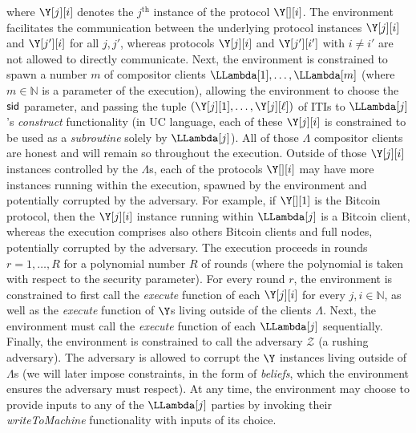 where $\Y[j][i]$ denotes the $j^\text{th}$ instance of
the protocol $\Y[][i]$. The environment facilitates the communication
between the underlying protocol instances $\Y[j][i]$ and $\Y[j'][i]$
for all $j, j'$, whereas protocols $\Y[j][i]$ and $\Y[j'][i']$
with $i \neq i'$ are not allowed to directly communicate.
Next, the environment is constrained to spawn
a number $m$ of compositor clients
$\LLambda[1], \ldots, \LLambda[m]$ (where $m \in \mathbb{N}$
is a parameter of the execution), allowing
the environment to choose the $\textsf{sid}$ parameter,
and passing the tuple $(\Y[j][1], \ldots, \Y[j][\ell])$ of ITIs
to $\LLambda[j]$'s \emph{construct} functionality
(in UC language, each of these $\Y[j][i]$ is constrained to be used
as a \emph{subroutine} solely by $\LLambda[j]$).
All of those $\Lambda$ compositor clients are honest and will remain
so throughout the execution.
Outside of those $\Y[j][i]$ instances controlled by the $\Lambda$s, each of
the protocols $\Y[][i]$ may have more instances running within the execution,
spawned by the environment and potentially corrupted by the adversary.
For example, if $\Y[][1]$ is the Bitcoin protocol, then the $\Y[j][i]$
instance running within $\LLambda[j]$ is a Bitcoin client, whereas the
execution comprises also others Bitcoin clients and full nodes, potentially
corrupted by the adversary.
The execution proceeds in rounds $r = 1, \ldots, R$
for a polynomial number $R$ of rounds (where the polynomial
is taken with respect to the security parameter). For every
round $r$, the environment is constrained to first call
the \emph{execute} function of each $\Y[j][i]$ for every
$j, i \in \mathbb{N}$, as well as the \emph{execute} function of $\Y$s
living outside of the clients $\Lambda$. Next, the environment must call
the \emph{execute} function of each $\LLambda[j]$ sequentially.
Finally, the environment is constrained to call the
adversary $\mathcal{Z}$ (a rushing adversary).
The adversary is allowed to corrupt the $\Y$ instances living outside of $\Lambda$s
(we will later impose constraints, in the form of \emph{beliefs}, which the
environment ensures the adversary must respect).
At any time, the environment may choose to provide inputs
to any of the $\LLambda[j]$ parties by invoking their \emph{writeToMachine}
functionality with inputs of its choice.

